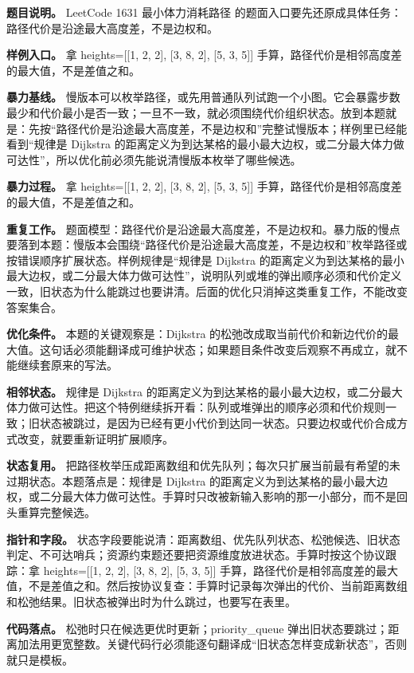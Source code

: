 \textbf{题目说明。} LeetCode 1631 最小体力消耗路径 的题面入口要先还原成具体任务：路径代价是沿途最大高度差，不是边权和。

\textbf{样例入口。} 拿 heights=[[1, 2, 2], [3, 8, 2], [5, 3, 5]] 手算，路径代价是相邻高度差的最大值，不是差值之和。

\textbf{暴力基线。} 慢版本可以枚举路径，或先用普通队列试跑一个小图。它会暴露步数最少和代价最小是否一致；一旦不一致，就必须围绕代价组织状态。放到本题就是：先按“路径代价是沿途最大高度差，不是边权和”完整试慢版本；样例里已经能看到“规律是 Dijkstra 的距离定义为到达某格的最小最大边权，或二分最大体力做可达性”，所以优化前必须先能说清慢版本枚举了哪些候选。

\textbf{暴力过程。} 拿 heights=[[1, 2, 2], [3, 8, 2], [5, 3, 5]] 手算，路径代价是相邻高度差的最大值，不是差值之和。

\textbf{重复工作。} 题面模型：路径代价是沿途最大高度差，不是边权和。暴力版的慢点要落到本题：慢版本会围绕“路径代价是沿途最大高度差，不是边权和”枚举路径或按错误顺序扩展状态。样例规律是“规律是 Dijkstra 的距离定义为到达某格的最小最大边权，或二分最大体力做可达性”，说明队列或堆的弹出顺序必须和代价定义一致，旧状态为什么能跳过也要讲清。后面的优化只消掉这类重复工作，不能改变答案集合。

\textbf{优化条件。} 本题的关键观察是：Dijkstra 的松弛改成取当前代价和新边代价的最大值。这句话必须能翻译成可维护状态；如果题目条件改变后观察不再成立，就不能继续套原来的写法。

\textbf{相邻状态。} 规律是 Dijkstra 的距离定义为到达某格的最小最大边权，或二分最大体力做可达性。把这个特例继续拆开看：队列或堆弹出的顺序必须和代价规则一致；旧状态被跳过，是因为已经有更小代价到达同一状态。只要边权或代价合成方式改变，就要重新证明扩展顺序。

\textbf{状态复用。} 把路径枚举压成距离数组和优先队列；每次只扩展当前最有希望的未过期状态。本题落点是：规律是 Dijkstra 的距离定义为到达某格的最小最大边权，或二分最大体力做可达性。手算时只改被新输入影响的那一小部分，而不是回头重算完整候选。

\textbf{指针和字段。} 状态字段要能说清：距离数组、优先队列状态、松弛候选、旧状态判定、不可达哨兵；资源约束题还要把资源维度放进状态。手算时按这个协议跟踪：拿 heights=[[1, 2, 2], [3, 8, 2], [5, 3, 5]] 手算，路径代价是相邻高度差的最大值，不是差值之和。然后按协议复查：手算时记录每次弹出的代价、当前距离数组和松弛结果。旧状态被弹出时为什么跳过，也要写在表里。

\textbf{代码落点。} 松弛时只在候选更优时更新；priority\_queue 弹出旧状态要跳过；距离加法用更宽整数。关键代码行必须能逐句翻译成“旧状态怎样变成新状态”，否则就只是模板。


